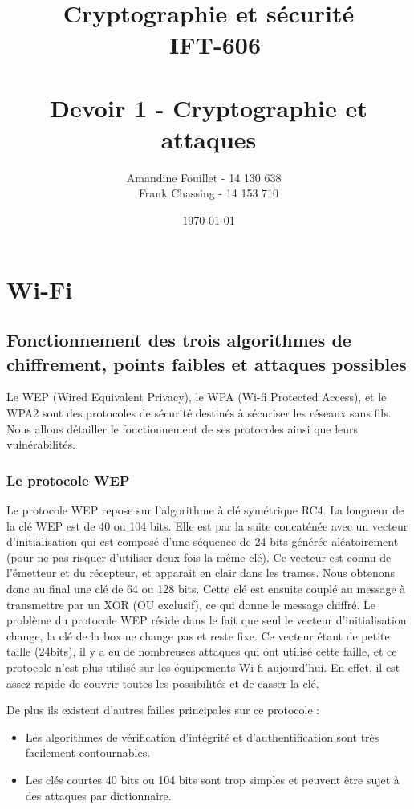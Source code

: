 \documentclass[11pt]{article}
\title{\vspace{\fill} Cryptographie et sécurité \\ ~\textbf{IFT-606} \\~\\ Devoir 1 - Cryptographie et attaques}
\author{Amandine Fouillet - 14 130 638 ~\\ Frank Chassing - 14 153 710}
\date{\today \vspace{\fill}}
\begin{document}
\maketitle
\newpage \thispagestyle{empty}
\null
\newpage
\tableofcontents
\listoffigures
\newpage
\section{Wi-Fi}
\subsection{Fonctionnement des trois algorithmes de chiffrement, points faibles et attaques possibles}
Le WEP (Wired Equivalent Privacy), le WPA (Wi-fi Protected Access), et le WPA2 sont des protocoles de sécurité destinés à sécuriser les réseaux sans fils. Nous allons détailler le fonctionnement de ses protocoles ainsi que leurs vulnérabilités.
\subsubsection{Le protocole WEP}
Le protocole WEP repose sur l’algorithme à clé symétrique RC4. La longueur de la clé WEP est de 40 ou 104 bits. Elle est par la suite concaténée avec un vecteur d’initialisation qui est composé d’une séquence de 24 bits générée aléatoirement (pour ne pas risquer d’utiliser deux fois la même clé). Ce vecteur est connu de l’émetteur et du récepteur, et apparait en clair dans les trames. Nous obtenons donc au final une clé de 64 ou 128 bits. Cette clé est ensuite couplé au message à transmettre par un XOR (OU exclusif), ce qui donne le message chiffré.
Le problème du protocole WEP réside dans le fait que seul le vecteur d’initialisation change, la clé de la box ne change pas et reste fixe. Ce vecteur étant de petite taille (24bits), il y a eu de nombreuses attaques qui ont utilisé cette faille, et ce protocole n’est plus utilisé sur les équipements Wi-fi aujourd’hui. En effet, il est assez rapide de couvrir toutes les possibilités et de casser la clé.

De plus ils existent d’autres failles principales sur ce protocole :
\begin{itemize}
\item 	Les algorithmes de vérification d’intégrité et d’authentification sont très facilement contournables.
\item 	Les clés courtes 40 bits ou 104 bits sont  trop simples et peuvent être sujet à des attaques par dictionnaire.
\end{itemize}
\end{document}
